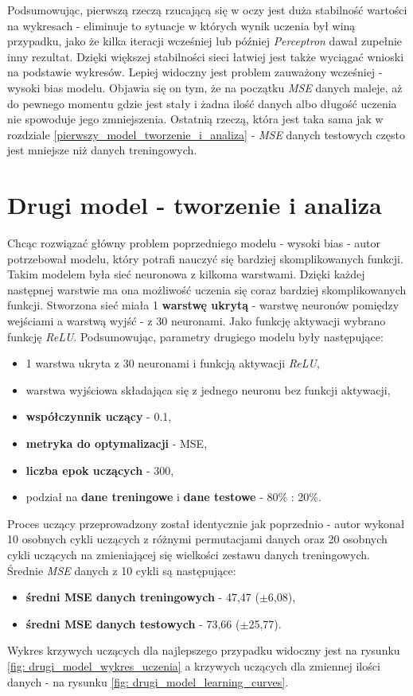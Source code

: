 \documentclass[12pt]{aghdpl}
\begin{document}
		Podsumowując, pierwszą rzeczą rzucającą się w oczy jest duża stabilność wartości na wykresach - eliminuje to sytuacje w których wynik uczenia był winą przypadku, jako że kilka iteracji wcześniej lub później \textit{Perceptron} dawał zupełnie inny rezultat. Dzięki większej stabilności sieci łatwiej jest także wyciągać wnioski na podstawie wykresów. Lepiej widoczny jest problem zauważony wcześniej - wysoki bias modelu. Objawia się on tym, że na początku \textit{MSE} danych maleje, aż do pewnego momentu gdzie jest stały i żadna ilość danych albo długość uczenia nie spowoduje jego zmniejszenia. Ostatnią rzeczą, która jest taka sama jak w rozdziale \ref{pierwszy_model_tworzenie_i_analiza} - \textit{MSE} danych testowych często jest mniejsze niż danych treningowych.
		
		\section{Drugi model - tworzenie i analiza} \label{drugi_model_tworzenie_i_analiza}
		Chcąc rozwiązać główny problem poprzedniego modelu - wysoki bias - autor potrzebował modelu, który potrafi nauczyć się bardziej skomplikowanych funkcji. Takim modelem była sieć neuronowa z kilkoma warstwami. Dzięki każdej następnej warstwie ma ona możliwość uczenia się coraz bardziej skomplikowanych funkcji. Stworzona sieć miała 1 \textbf{warstwę ukrytą} - warstwę neuronów pomiędzy wejściami a warstwą wyjść - z 30 neuronami. Jako funkcję aktywacji wybrano funkcję \textit{ReLU}.
		Podsumowując, parametry drugiego modelu były następujące:
		\begin{itemize}
			\item 1 warstwa ukryta z 30 neuronami i funkcją aktywacji \textit{ReLU},
			\item warstwa wyjściowa składająca się z jednego neuronu bez funkcji aktywacji,
			\item \textbf{współczynnik uczący} - 0.1,
			\item \textbf{metryka do optymalizacji} - MSE,
			\item \textbf{liczba epok uczących} - 300,
			\item podział na \textbf{dane treningowe} i \textbf{dane testowe} - 80\% : 20\%.
		\end{itemize}
		
		Proces uczący przeprowadzony został identycznie jak poprzednio - autor wykonał 10 osobnych cykli uczących z różnymi permutacjami danych oraz 20 osobnych cykli uczących na zmieniającej się wielkości zestawu danych treningowych. Średnie \textit{MSE} danych z 10 cykli są następujące:
		\begin{itemize}
		\item \textbf{średni MSE danych treningowych} - 47,47 ($\pm$6,08),
		\item \textbf{średni MSE danych testowych} - 73,66 ($\pm$25,77).
		\end{itemize}
		Wykres krzywych uczących dla najlepszego przypadku widoczny jest na rysunku \ref{fig: drugi_model_wykres_uczenia} a krzywych uczących dla zmiennej ilości danych - na rysunku \ref{fig: drugi_model_learning_curves}.
		
\end{document}

